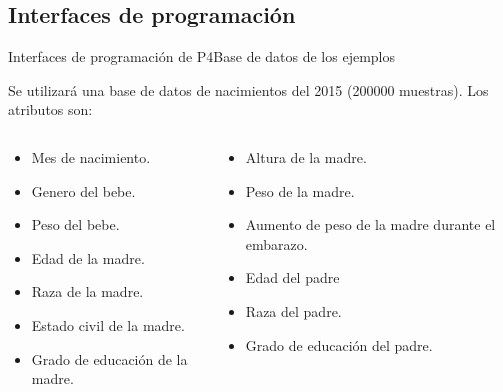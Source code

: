 \documentclass[10pt]{beamer}
\newcommand{\1}{
        	\setbeamertemplate{background}{
        		\texttt{[image: img/1]}
        		\tikz[overlay] \fill[fill opacity=0.75,fill=white] (0,0) rectangle (-\paperwidth,\paperheight);
        	}
}
\begin{document}
\subsection{Interfaces de programación}

\begin{frame}{Interfaces de programación de P4}{Base de datos de los ejemplos}
	\begin{block}{}
		Se utilizará una base de datos de nacimientos del 2015 (200000 muestras). Los atributos son:
		
		\begin{columns}
			\begin{column}{0.48\textwidth}
				\begin{itemize}
					\item Mes de nacimiento.
					\item Genero del bebe.
					\item Peso del bebe.
					\item Edad de la madre.
					\item Raza de la madre.
					\item Estado civil de la madre.
					\item Grado de educación de la madre.
				\end{itemize}
			\end{column}
			\begin{column}{0.48\textwidth}
				\begin{itemize}
					\item Altura de la madre.
					\item Peso de la madre.
					\item Aumento de peso de la madre durante el embarazo.
					\item Edad del padre
					\item Raza del padre.
					\item Grado de educación del padre.
				\end{itemize}	
			\end{column}
		\end{columns}
		
		
	\end{block}
\end{frame}
\end{document}
